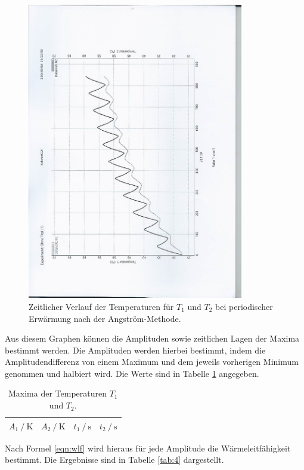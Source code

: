 \begin{figure}[H]
  \centering
  \includegraphics[height=13cm, angle=270]{scan-3.jpg}
  \caption{Zeitlicher Verlauf der Temperaturen für $T_1$ und $T_2$ bei periodischer Erwärmung nach der Angström-Methode.}
  \label{fig:5}
\end{figure}

Aus diesem Graphen können die Amplituden sowie zeitlichen Lagen der Maxima bestimmt werden.
Die Amplituden werden hierbei bestimmt, indem die Amplitudendifferenz von einem Maximum und dem jeweils vorherigen Minimum genommen und halbiert wird.
Die Werte sind in Tabelle \ref{tab:3} angegeben.

\begin{table}
  \centering
  \caption{Maxima der Temperaturen $T_1$ und $T_2$.}
  \label{tab:3}
  \begin{tabular}{c c c c}
    \toprule
    {$A_1 \:/\: \si{\kelvin}$} & {$A_2 \:/\: \si{\kelvin}$}  & {$t_1 \:/\: \si{\second}$}  & {$t_2 \:/\: \si{\second}$}\\
    \midrule
    
    \bottomrule
  \end{tabular}
\end{table}

Nach Formel \eqref{eqn:wlf} wird hieraus für jede Amplitude die Wärmeleitfähigkeit bestimmt.
Die Ergebnisse sind in Tabelle \ref{tab:4} dargestellt.

